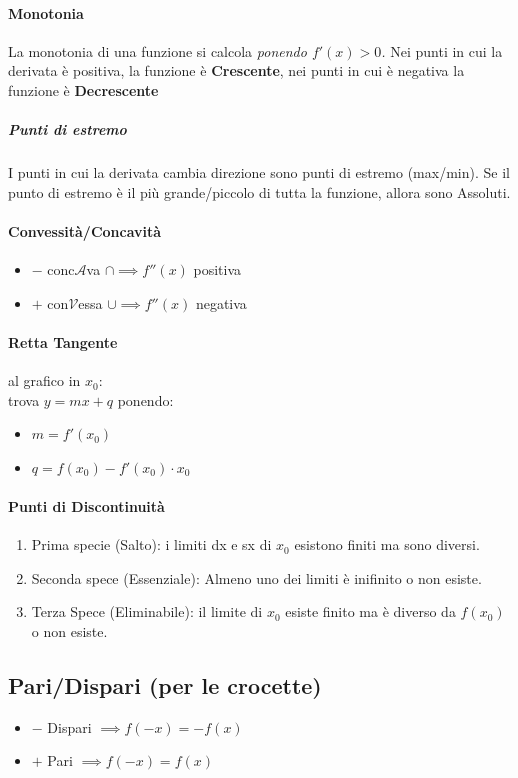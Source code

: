 \documentclass[12pt, a4paper]{article}
\begin{document}
\paragraph*{Monotonia}
La monotonia di una funzione si calcola \emph{ponendo $f'(x)>0$.}
Nei punti in cui la derivata è positiva, la funzione è \textbf{Crescente}, nei punti in cui è negativa la funzione è \textbf{Decrescente}
\subparagraph*{Punti di estremo} I punti in cui la derivata cambia direzione sono punti di estremo (max/min).
Se il punto di estremo è il più grande/piccolo di tutta la funzione, allora sono Assoluti.

\paragraph*{Convessità/Concavità}
\begin{itemize}
	\item $-$ conc$\mathcal{A}$va $\cap \implies f''(x)$ positiva
	\item $+$ con$\mathcal{V}$essa $\cup \implies f''(x)$ negativa
\end{itemize}


\paragraph*{Retta Tangente} al grafico in $x_0$:\\
trova $y=mx + q$ ponendo:
\begin{itemize}
	\item $m=f'(x_0)$
	\item $q=f(x_0)-f'(x_0)\cdot x_0$
\end{itemize}

\paragraph*{\textbf{Punti di Discontinuità}}
\begin{enumerate}
	\item Prima specie (Salto): i limiti dx e sx di $x_0$ esistono finiti ma sono diversi.
	\item Seconda spece (Essenziale): Almeno uno dei limiti è inifinito o non esiste.
	\item Terza Spece (Eliminabile): il limite di $x_0$ esiste finito ma è diverso da $f(x_0)$ o non esiste.
\end{enumerate}

\subsection*{Pari/Dispari (per le crocette)}
\begin{itemize}
	\item $-$ Dispari $\implies f(-x)=-f(x)$
	\item $+$ Pari $\implies f(-x)=f(x)$
\end{itemize}
\end{document}
